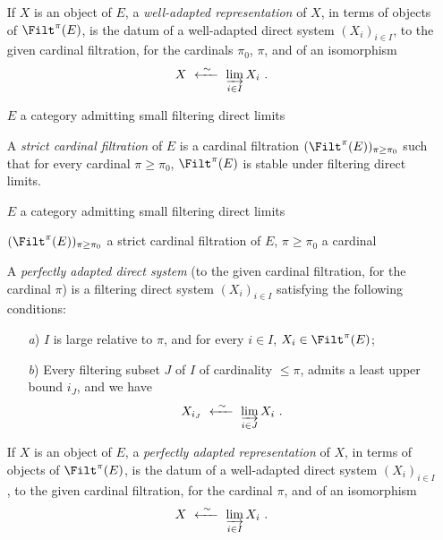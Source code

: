 \begin{itemize}

If $X$ is an object of $E$, a \textit{well-adapted representation} of $X$, in terms of objects of $\Filt^{\pi}(E)$, is the datum of a well-adapted direct system $(X_i)_{i\in I}$, to the given cardinal filtration, for the cardinals $\pi_0$, $\pi$, and of an isomorphism
\[
X \ \xleftarrow{\ \sim\ }\ \varinjlim_{i\in I} X_i \ .
\]

\item[\textbullet] $E$ a category admitting small filtering direct limits

A \textit{strict cardinal filtration} of $E$ is a cardinal filtration $(\Filt^{\pi}(E))_{\pi\geq\pi_0}$ such that for every cardinal $\pi \geq \pi_0$, $\Filt^{\pi}(E)$ is stable under filtering direct limits.

\item[\textbullet] $E$ a category admitting small filtering direct limits

$(\Filt^{\pi}(E))_{\pi\geq\pi_0}$ a strict cardinal filtration of $E$, \quad $\pi \geq \pi_0$ a cardinal

A \textit{perfectly adapted direct system} (to the given cardinal filtration, for the cardinal $\pi$) is a filtering direct system $(X_i)_{i\in I}$ satisfying the following conditions:
\begin{itemize}
\item[\textit{a})] $I$ is large relative to $\pi$, and for every $i \in I$, $X_i \in \Filt^{\pi}(E)$;
\item[\textit{b})] Every filtering subset $J$ of $I$ of cardinality $\leq \pi$, admits a least upper bound $i_J$, and we have
\[
X_{i_J} \ \xleftarrow{\ \sim\ }\ \varinjlim_{i\in J} X_i \ .
\]
\end{itemize}
If $X$ is an object of $E$, a \textit{perfectly adapted representation} of $X$, in terms of objects of $\Filt^{\pi}(E)$, is the datum of a well-adapted direct system $(X_i)_{i\in I}$, to the given cardinal filtration, for the cardinal $\pi$, and of an isomorphism
\[
X \ \xleftarrow{\ \sim\ }\ \varinjlim_{i\in I} X_i \ .
\]
\end{itemize}
